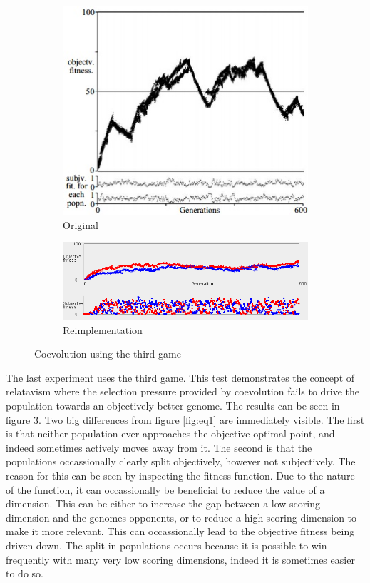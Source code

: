 \documentclass{article}
\begin{document}
\begin{figure}
\centering
\begin{subfigure}{.5\textwidth}
  \centering
  \includegraphics[width=.8\linewidth]{Screencaps/RelativismOrig}
  \caption{Original}
  \label{fig:eq3orig}
\end{subfigure}%
\begin{subfigure}{.5\textwidth}
  \centering
  \includegraphics[width=\linewidth]{Screencaps/RelativismReimp}
  \caption{Reimplementation}
  \label{fig:eq3reimp}
\end{subfigure}
\caption{Coevolution using the third game}
\label{fig:eq3}
\end{figure}

The last experiment uses the third game. This test demonstrates the concept of relatavism where the selection pressure provided by coevolution fails to drive the population towards an objectively better genome. The results can be seen in figure \ref{fig:eq3}. Two big differences from figure \ref{fig:eq1} are immediately visible. The first is that neither population ever approaches the objective optimal point, and indeed sometimes actively moves away from it. The second is that the populations occassionally clearly split objectively, however not subjectively. The reason for this can be seen by inspecting the fitness function. Due to the nature of the function, it can occassionally be beneficial to reduce the value of a dimension. This can be either to increase the gap between a low scoring dimension and the genomes opponents, or to reduce a high scoring dimension to make it more relevant. This can occassionally lead to the objective fitness being driven down. The split in populations occurs because it is possible to win frequently with many very low scoring dimensions, indeed it is sometimes easier to do so.
\end{document}
